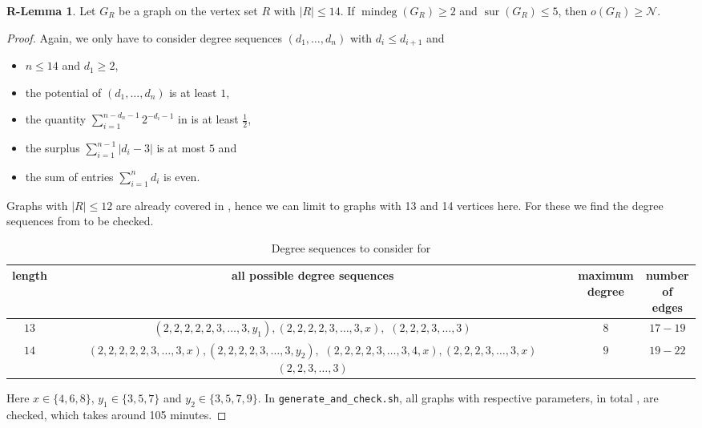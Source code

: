 \documentclass[a4paper,11pt,oneside]{scrartcl}
\theoremstyle{definition}
\newtheorem{r-lemma}{R-Lemma}
\theoremstyle{remark}
\DeclareMathOperator{\mindeg}{mindeg}
\DeclareMathOperator{\sur}{sur}
\begin{document}
\begin{r-lemma}\label{r-lemma:R_14_no_deg_1}
    Let $G_{R}$ be a graph on the vertex set $R$ with $|R| \leq 14$. If $\mindeg(G_R) \geq 2$ and $\sur(G_R) \leq 5$, then $o(G_R) \geq \mathcal N$.
\end{r-lemma}
\begin{proof}
    Again, we only have to consider degree sequences $(d_1,\dots,d_n)$ with $d_i\leq d_{i+1}$ and
    \begin{itemize}
        \item $n \leq 14$ and $d_1 \geq 2$,
        \item the potential of $(d_1,\dots,d_n)$ is at least $1$,
        \item the quantity $\sum_{i=1}^{n-d_n-1} 2^{-d_i-1}$ in  is at least $\frac 12$, 
        \item the surplus $\sum_{i = 1}^{n-1} |d_i-3|$ is at most $5$ and 
        \item the sum of entries $\sum_{i=1}^n d_i$ is even.
    \end{itemize}
    Graphs with $|R|\leq12$ are already covered in , hence we can limit to graphs with 13 and 14 vertices here.
    For these we find the degree sequences from  to be checked.
    \begin{table}[!ht]
        \centering
        \begin{tabular}{c c c c} 
            \toprule
            length & all possible degree sequences & \makecell{maximum\\degree} & \makecell{number\\of edges}\\
            \midrule
            $13$ & \makecell{$(2,2,2,2,2,3,\dots,3,y_1), (2,2,2,2,3,\dots,3,x),$\\
            $(2,2,2,3,\dots,3)$} & $8$ & $17-19$ \\ 
            $14$ & \makecell{$(2,2,2,2,2,3,\dots,3,x), (2,2,2,2,3,\dots,3,y_2),$\\
            $(2,2,2,2,3,\dots,3,4,x), (2,2,2,3,\dots,3,x)$\\
            $(2,2,3,\dots,3)$} & $9$ & $19-22$ \\
            \bottomrule 
        \end{tabular}
        \caption{Degree sequences to consider for }\label{table:R_14_no_deg_1}
    \end{table}
    Here $x\in\{4,6,8\}$, $y_1\in\{3,5,7\}$ and $y_2\in\{3,5,7,9\}$. In \texttt{generate\_and\_check.sh}, all graphs with respective parameters, in total , are checked, which takes around 105 minutes.
\end{proof}
\end{document}
